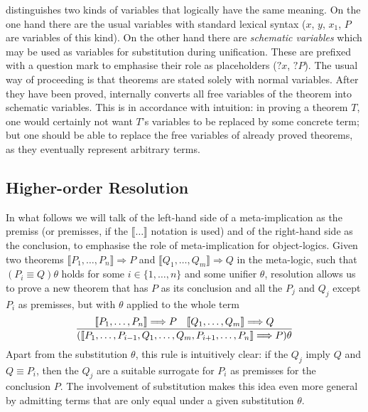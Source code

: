 \begin{rem}
  \Isabelle distinguishes two kinds of variables that logically have the same
  meaning. On the one hand there are the usual variables with standard lexical
  syntax ($x$, $y$, $x_1$, $P$ are variables of this kind). On the other hand
  there are \emph{schematic variables} which may be used as variables for
  substitution during unification. These are prefixed with a question mark to
  emphasise their role as placeholders (\EG $?x$, $?P$). The usual way of
  proceeding is that theorems are stated solely with normal variables. After
  they have been proved, \Isabelle internally converts all free variables of the
  theorem into schematic variables. This is in accordance with intuition: in
  proving a theorem $T$, one would certainly not want $T$'s variables to be
  replaced by some concrete term; but one should be able to replace the free
  variables of already proved theorems, as they eventually represent arbitrary
  terms.
\end{rem}



\subsection{Higher-order Resolution}
\label{sec:nat-ded-resolution}

In what follows we will talk of the left-hand side of a meta-implication as the
premiss (or premisses, if the $\llbracket\ldots\rrbracket$ notation is used) and of the right-hand side
as the conclusion, to emphasise the role of meta-implication for object-logics.
Given two theorems $\llbracket P_1,\ldots,P_n\rrbracket \Longrightarrow P$ and $\llbracket Q_1,\ldots,Q_m\rrbracket \Longrightarrow Q$ in the meta-logic,
such that $(P_i \equiv Q)\theta$ holds for some $i\in\{1,\ldots,n\}$ and some unifier $\theta$,
resolution allows us to prove a new theorem that has $P$ as its conclusion and
all the $P_j$ and $Q_j$ except $P_i$ as premisses, but with $\theta$ applied to the
whole term
\begin{equation}
  \frac{\displaystyle \llbracket P_1,\ldots,P_n\rrbracket \Longrightarrow P \quad \llbracket Q_1, \ldots, Q_m\rrbracket \Longrightarrow Q}{\displaystyle (\llbracket P_1,\ldots,P_{i-1},Q_1,\ldots,Q_m,P_{i+1},\ldots,P_n\rrbracket \Longrightarrow P)\theta}
\end{equation}
Apart from the substitution $\theta$, this rule is intuitively clear: if the $Q_j$
imply $Q$ and $Q \equiv P_i$, then the $Q_j$ are a suitable surrogate for $P_i$ as
premisses for the conclusion $P$. The involvement of substitution makes this
idea even more general by admitting terms that are only equal under a given
substitution $\theta$.  

